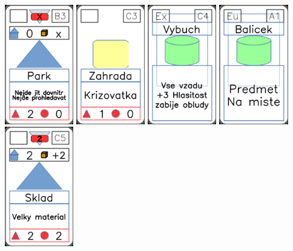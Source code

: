 \documentclass[a4paper]{article}
\begin{document}
	\includegraphics[width=3.0cm]{img-3_22}
	\includegraphics[width=3.0cm]{img-3_27}
	\includegraphics[width=3.0cm]{img-4_13}
	\includegraphics[width=3.0cm]{img-4_30}
	\includegraphics[width=3.0cm]{img-3_14}
\end{document}
